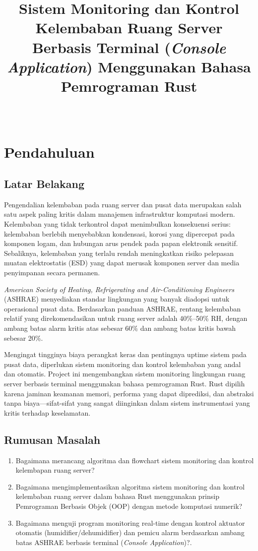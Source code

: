 \documentclass[journal]{IEEEtran}
\title{Sistem Monitoring dan Kontrol Kelembaban Ruang Server Berbasis Terminal (\textit{Console Application}) Menggunakan Bahasa Pemrograman Rust}
\author{
    \IEEEauthorblockN{Siti Sahira Elanoor \& Kenya Yuriska Haryono Putri} \\
    \IEEEauthorblockA{\textit{Departemen Teknik Instrumentasi} \\
    \textit{Institut Teknologi Sepuluh Nopember}\\
    Surabaya, Indonesia \\
    2042251046@student.its.ac.id, 2042251077@student.its.ac.id
}
}
\begin{document}
\maketitle

\section{Pendahuluan}

\subsection{Latar Belakang}
Pengendalian kelembaban pada ruang server dan pusat data merupakan salah satu aspek paling kritis dalam manajemen infrastruktur komputasi modern. Kelembaban yang tidak terkontrol dapat menimbulkan konsekuensi serius: kelembaban berlebih menyebabkan kondensasi, korosi yang dipercepat pada komponen logam, dan hubungan arus pendek pada papan elektronik sensitif. Sebaliknya, kelembaban yang terlalu rendah meningkatkan risiko pelepasan muatan elektrostatis (ESD) yang dapat merusak komponen server dan media penyimpanan secara permanen.

\textit{American Society of Heating, Refrigerating and Air-Conditioning Engineers} (ASHRAE) menyediakan standar lingkungan yang banyak diadopsi untuk operasional pusat data. Berdasarkan panduan ASHRAE, rentang kelembaban relatif yang direkomendasikan untuk ruang server adalah 40\%--50\% RH, dengan ambang batas alarm kritis atas sebesar 60\% dan ambang batas kritis bawah sebesar 20\%.

Mengingat tingginya biaya perangkat keras dan pentingnya uptime sistem pada pusat data, diperlukan sistem monitoring dan kontrol kelembaban yang andal dan otomatis. Project ini mengembangkan sistem monitoring lingkungan ruang server berbasis terminal menggunakan bahasa pemrograman Rust. Rust dipilih karena jaminan keamanan memori, performa yang dapat diprediksi, dan abstraksi tanpa biaya---sifat-sifat yang sangat diinginkan dalam sistem instrumentasi yang kritis terhadap keselamatan.

\subsection{Rumusan Masalah}
\begin{enumerate}
  \item Bagaimana merancang algoritma dan flowchart sistem monitoring dan kontrol kelembapan ruang server?
  \item Bagaimana mengimplementasikan algoritma sistem monitoring dan kontrol kelembaban ruang server dalam bahasa Rust menggunakan prinsip Pemrograman Berbasis Objek (OOP) dengan metode komputasi numerik?
  \item Bagaimana menguji program monitoring real-time dengan kontrol aktuator otomatis (humidifier/dehumidifier) dan pemicu alarm berdasarkan ambang batas ASHRAE berbasis terminal (\textit{Console Application})?.
\end{enumerate}
\end{document}
